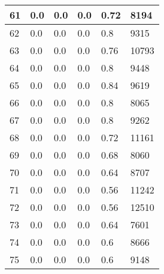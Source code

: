 \begin{longtable}{|l|l|l|l|l|l|}
61 & 0.0 & 0.0 & 0.0 & 0.72 & 8194 \\ \hline 
62 & 0.0 & 0.0 & 0.0 & 0.8 & 9315 \\ \hline 
63 & 0.0 & 0.0 & 0.0 & 0.76 & 10793 \\ \hline 
64 & 0.0 & 0.0 & 0.0 & 0.8 & 9448 \\ \hline 
65 & 0.0 & 0.0 & 0.0 & 0.84 & 9619 \\ \hline 
66 & 0.0 & 0.0 & 0.0 & 0.8 & 8065 \\ \hline 
67 & 0.0 & 0.0 & 0.0 & 0.8 & 9262 \\ \hline 
68 & 0.0 & 0.0 & 0.0 & 0.72 & 11161 \\ \hline 
69 & 0.0 & 0.0 & 0.0 & 0.68 & 8060 \\ \hline 
70 & 0.0 & 0.0 & 0.0 & 0.64 & 8707 \\ \hline 
71 & 0.0 & 0.0 & 0.0 & 0.56 & 11242 \\ \hline 
72 & 0.0 & 0.0 & 0.0 & 0.56 & 12510 \\ \hline 
73 & 0.0 & 0.0 & 0.0 & 0.64 & 7601 \\ \hline 
74 & 0.0 & 0.0 & 0.0 & 0.6 & 8666 \\ \hline 
75 & 0.0 & 0.0 & 0.0 & 0.6 & 9148 \\ \hline 
\end{longtable}